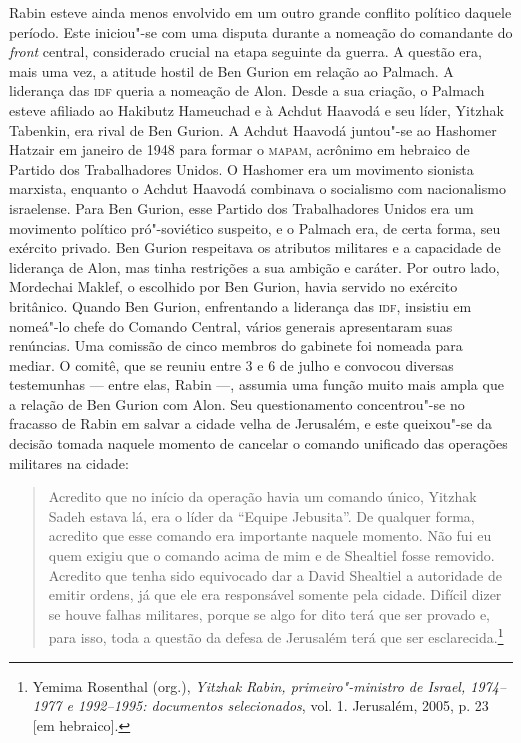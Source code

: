 Rabin esteve ainda menos envolvido em um outro grande conflito político daquele
período. Este iniciou"-se com uma disputa durante a nomeação do
comandante do \textit{front} central, considerado crucial na etapa seguinte da
guerra. A questão era, mais uma vez, a atitude hostil de Ben Gurion em
relação ao Palmach. A liderança das \textsc{idf} queria a nomeação de Alon. Desde
a sua criação, o Palmach esteve afiliado ao Hakibutz Hameuchad e à Achdut
Haavodá e seu líder, Yitzhak Tabenkin, era rival de Ben Gurion. A Achdut
Haavodá juntou"-se ao Hashomer Hatzair em janeiro de 1948 para formar o
\textsc{mapam}, acrônimo em hebraico de Partido dos Trabalhadores Unidos. O
Hashomer era um movimento sionista marxista, enquanto o Achdut Haavodá
combinava o socialismo com nacionalismo israelense. Para Ben Gurion, esse
Partido dos Trabalhadores Unidos era um movimento político
pró"-soviético suspeito, e o Palmach era, de certa forma, seu exército
privado. Ben Gurion respeitava os atributos militares e a capacidade de
liderança de Alon, mas tinha restrições a sua ambição e caráter. Por outro lado,
Mordechai Maklef, o escolhido por Ben Gurion, havia servido
no exército britânico. Quando Ben Gurion, enfrentando a liderança das
\textsc{idf}, insistiu em nomeá"-lo chefe do Comando Central, vários generais
apresentaram suas renúncias. Uma comissão de cinco membros do gabinete
foi nomeada para mediar. O comitê, que se reuniu entre 3 e 6 de julho e
convocou diversas testemunhas --- entre elas, Rabin ---, assumia uma função
muito mais ampla que a relação de Ben Gurion com Alon. Seu
questionamento concentrou"-se no fracasso de Rabin em salvar a cidade
velha de Jerusalém, e este queixou"-se da decisão tomada naquele momento
de cancelar o comando unificado das operações militares na cidade:

\begin{quote}
Acredito que no início da operação havia um comando único, Yitzhak
Sadeh estava lá, era o líder da ``Equipe Jebusita''. De qualquer forma,
acredito que esse comando era importante naquele momento. Não fui eu
quem exigiu que o comando acima de mim e de Shealtiel fosse removido.
Acredito que tenha sido equivocado dar a David Shealtiel a autoridade de
emitir ordens, já que ele era responsável somente pela cidade. Difícil
dizer se houve falhas militares, porque se algo for dito terá que ser
provado e, para isso, toda a questão da defesa de Jerusalém terá que ser
esclarecida.\footnote{Yemima Rosenthal (org.), \textit{Yitzhak Rabin, primeiro"-ministro de
Israel, 1974--1977 e 1992--1995: documentos selecionados}, vol. 1. Jerusalém,
2005, p. 23 {[}em hebraico{]}.}
\end{quote}

